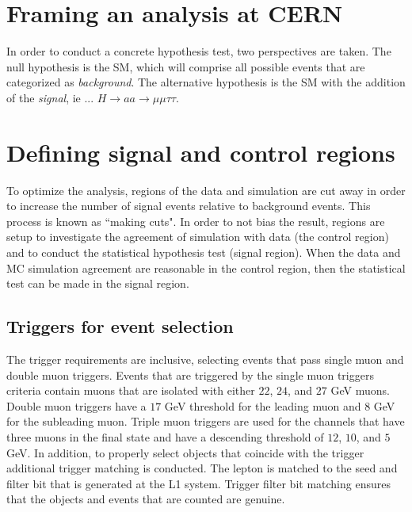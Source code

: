 \section{Framing an analysis at CERN}
In order to conduct a concrete hypothesis test, two perspectives are taken. 
The null hypothesis is the SM, which will comprise all possible events that are categorized as \textit{background}.
The alternative hypothesis is the SM with the addition of the \textit{signal}, ie ... $H \rightarrow a a \rightarrow \mu\mu\tau\tau$. 

\section{Defining signal and control regions}
To optimize the analysis, regions of the data and simulation are cut away in order to increase the number of signal events relative to background events. This process is known as ``making cuts". In order to not bias the result, regions are setup to investigate the agreement of simulation with data (the control region) and to conduct the statistical hypothesis test (signal region). When the data and MC simulation agreement are reasonable in the control region, then the statistical test can be made in the signal region.  

\subsection{Triggers for event selection}
\label{sec:trig}
The trigger requirements are inclusive, selecting events that pass single muon and double muon triggers. Events that are triggered by the single muon triggers criteria contain muons that are isolated with either $22$, $24$, and $27$ GeV muons. Double muon triggers have a $17$ GeV threshold for the leading muon and $8$ GeV for the subleading muon. Triple muon triggers are used for the channels that have three muons in the final state and have a descending threshold of $12$, $10$, and $5$ GeV. In addition, to properly select objects that coincide with the trigger additional trigger matching is conducted. The lepton is matched to the seed and filter bit that is generated at the L1 system. Trigger filter bit matching ensures that the objects and events that are counted are genuine. 

